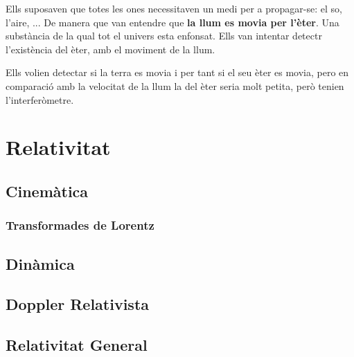 \documentclass[12pt]{article}
\begin{document}
\begin{tcolorbox}[
    colback=white,      
    colframe=black,    
    coltext=black,     
    boxrule=1pt,        
    arc=0pt 
  ]
\begin{center}
  \end{center}

  Ells suposaven que totes les ones necessitaven un medi per a propagar-se: el so, l'aire, ... De manera que van entendre que \textbf{la llum es movia per l'èter}. Una substància de la qual tot el univers esta enfonsat. Ells van intentar detectr l'existència del èter, amb el moviment de la llum.

  Ells volien detectar si la terra es movia i per tant si el seu èter es movia, pero en comparació amb la velocitat de la llum la del èter seria molt petita, però tenien l'interferòmetre.
\end{tcolorbox}

\section{Relativitat}



\subsection{Cinemàtica}
\subsubsection{Transformades de Lorentz}
\subsection{Dinàmica}
\subsection{Doppler Relativista}
\subsection{Relativitat General}
\end{document}
